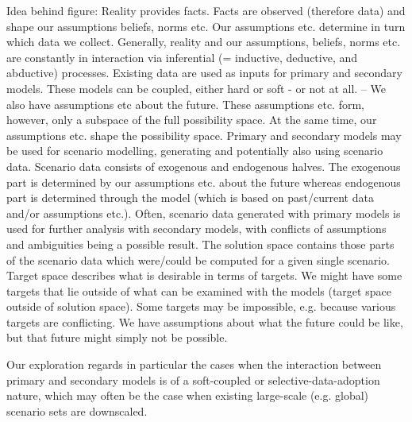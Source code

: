 \documentclass{article}
\begin{document}
\begin{refsection}
Idea behind figure: 
Reality provides facts. 
Facts are observed (therefore data) and shape our assumptions beliefs, norms etc. 
Our assumptions etc. determine in turn which data we collect. 
Generally, reality and our assumptions, beliefs, norms etc. are constantly in interaction via inferential (= inductive, deductive, and abductive) processes. 
Existing data are used as inputs for primary and secondary models. 
These models can be coupled, either hard or soft - or not at all. 
--
We also have assumptions etc about the future. 
These assumptions etc. form, however, only a subspace of the full possibility space. 
At the same time, our assumptions etc. shape the possibility space. 
Primary and secondary models may be used for scenario modelling, generating and potentially also using scenario data. 
Scenario data consists of exogenous and endogenous halves. The exogenous part is determined by our assumptions etc. about the future whereas endogenous part is determined through the model (which is based on past/current data and/or assumptions etc.). 
Often, scenario data generated with primary models is used for further analysis with secondary models, with conflicts of assumptions and ambiguities being a possible result. 
The solution space contains those parts of the scenario data which were/could be computed for a given single scenario. 
Target space describes what is desirable in terms of targets. 
We might have some targets that lie outside of what can be examined with the models (target space outside of solution space). 
Some targets may be impossible, e.g. because various targets are conflicting. 
We have assumptions about what the future could be like, but that future might simply not be possible.

Our exploration regards in particular the cases when the interaction between primary and secondary models is of a soft-coupled or selective-data-adoption nature, which may often be the case when existing large-scale (e.g. global) scenario sets are downscaled.


\end{refsection}
\end{document}
